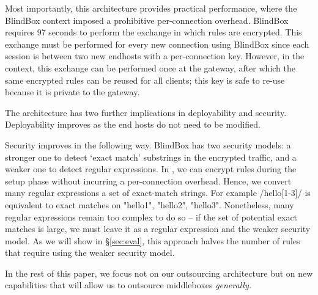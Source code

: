 Most importantly, this architecture provides practical performance, where the BlindBox context imposed a prohibitive per-connection overhead.
BlindBox requires 97 seconds to perform the exchange in which rules are encrypted.
This exchange must be performed for every new connection using BlindBox since each session is between two new endhosts with a per-connection key.
However, in the \sys context, this exchange can be performed once at the gateway, after which the same encrypted rules can be reused for all clients; this key is safe to re-use because it is private to the gateway.

The \sys architecture has two further implications in deployability and security. 
Deployability improves as the end hosts do not need to be modified.

Security improves in the following way.
BlindBox has two security models: a stronger one to detect `exact match' substrings in the encrypted traffic, and a weaker one to detect regular expressions.
In \sys, we can encrypt rules during the setup phase without incurring a per-connection overhead.
Hence, we convert many regular expressions  a set of exact-match strings. 
For example /hello[1-3]/ is equivalent to exact matches on "hello1", "hello2", "hello3".
Nonetheless, many regular expressions remain too complex to do so -- if the set of potential exact matches is large, we must leave it as a regular expression and the weaker security model.
As we will show in \S\ref{sec:eval}, this approach halves the number of rules that require using the weaker security model.

In the rest of this paper, we focus not on our outsourcing architecture but on new capabilities that will allow us to outsource middleboxes {\it generally.}
